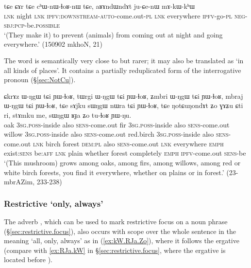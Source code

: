 \begin{exe}
\ex \label{ex:aRAndWndAt.juCenW}
\gll tɕe ɕɤr tɕe cʰɯ-nɯ-ɬoʁ-nɯ tɕe, aʁɤndɯndɤt ju-ɕe-nɯ mɤ-kɯ-kʰɯ \\
\textsc{lnk} night \textsc{lnk} \textsc{ipfv}:\textsc{downstream}-\textsc{auto}-come.out-\textsc{pl} \textsc{lnk} everywhere \textsc{ipfv}-go-\textsc{pl} \textsc{neg}-\textsc{sbj}:\textsc{pcp}-be.\textsc{possible} \\
\glt `(They make it) to prevent (animals) from coming out at night and going everywhere.' (150902 mkhoN, 21)
\end{exe} 

The word   is semantically very close to  but rarer; it may also be translated as `in all kinds of places'. It contains a partially reduplicated form of the interrogative pronoun  (§\ref{sec:NotCu}).

 \begin{exe}
\ex \label{ex:NotCuNondAt}
\gll ɕkrɤz ɯ-ŋgɯ tɕi ɲɯ-ɬoʁ, tɯrgi ɯ-ŋgɯ tɕi ɲɯ-ɬoʁ, ʑmbri ɯ-ŋgɯ tɕi ɲɯ-ɬoʁ,  mbraj ɯ-ŋgɯ tɕi ɲɯ-ɬoʁ, tɕe sɤjku sɯŋgɯ nɯra tɕi ɲɯ-ɬoʁ, tɕe ŋotɕuŋondɤt ʑo ɣɤʑu ɕti ri, stɤmku me, sɯŋgɯ ʁɟa ʑo tu-ɬoʁ ɲɯ-ŋu. \\
oak \textsc{3sg}.\textsc{poss}-inside also \textsc{sens}-come.out fir \textsc{3sg}.\textsc{poss}-inside also \textsc{sens}-come.out willow \textsc{3sg}.\textsc{poss}-inside also \textsc{sens}-come.out red.birch \textsc{3sg}.\textsc{poss}-inside also \textsc{sens}-come.out \textsc{lnk} birch  forest \textsc{dem}:\textsc{pl} also \textsc{sens}-come.out \textsc{lnk} everywhere \textsc{emph} exist:\textsc{sens} be:\textsc{aff}  \textsc{lnk} plain whether  forest completely \textsc{emph} \textsc{ipfv}-come.out \textsc{sens}-be \\
\glt `(This mushroom) grows among oaks, among firs, among willows, among red or white birch forests, you find it everywhere, whether on plains or in forest.' (23-mbrAZim, 233-238)
\end{exe} 


\subsubsection{Restrictive `only, always'} \label{sec:restrictive.adverbs}
 The adverb  , which can be used to mark restrictive focus on a noun phrase (§\ref{sec:restrictive.focus}), also occurs with scope over the whole sentence in the meaning `all, only, always' as in (\ref{ex:kW.RJa.Zo}), where it follows the ergative  (compare with \ref{ex:RJa.kW} in §\ref{sec:restrictive.focus}, where the ergative is located before ).

